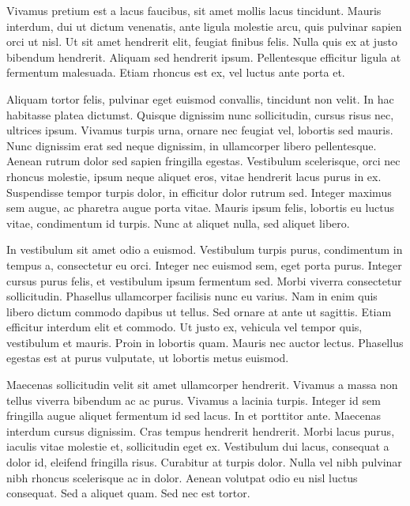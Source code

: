 
Vivamus pretium est a lacus faucibus, sit amet mollis lacus tincidunt. Mauris interdum,
dui ut dictum venenatis, ante ligula molestie arcu, quis pulvinar sapien orci ut nisl. Ut
sit amet hendrerit elit, feugiat finibus felis. Nulla quis ex at justo bibendum hendrerit.
Aliquam sed hendrerit ipsum. Pellentesque efficitur ligula at fermentum malesuada. Etiam
rhoncus est ex, vel luctus ante porta et.

Aliquam tortor felis, pulvinar eget euismod convallis, tincidunt non velit. In hac habitasse
platea dictumst. Quisque dignissim nunc sollicitudin, cursus risus nec, ultrices ipsum.
Vivamus turpis urna, ornare nec feugiat vel, lobortis sed mauris. Nunc dignissim erat sed
neque dignissim, in ullamcorper libero pellentesque. Aenean rutrum dolor sed sapien fringilla
egestas. Vestibulum scelerisque, orci nec rhoncus molestie, ipsum neque aliquet eros, vitae
hendrerit lacus purus in ex. Suspendisse tempor turpis dolor, in efficitur dolor rutrum sed.
Integer maximus sem augue, ac pharetra augue porta vitae. Mauris ipsum felis, lobortis eu
luctus vitae, condimentum id turpis. Nunc at aliquet nulla, sed aliquet libero.


In vestibulum sit amet odio a euismod. Vestibulum turpis purus, condimentum in tempus a,
consectetur eu orci. Integer nec euismod sem, eget porta purus. Integer cursus purus felis,
et vestibulum ipsum fermentum sed. Morbi viverra consectetur sollicitudin. Phasellus ullamcorper
facilisis nunc eu varius. Nam in enim quis libero dictum commodo dapibus ut tellus. Sed
ornare at ante ut sagittis. Etiam efficitur interdum elit et commodo. Ut justo ex, vehicula
vel tempor quis, vestibulum et mauris. Proin in lobortis quam. Mauris nec auctor lectus.
Phasellus egestas est at purus vulputate, ut lobortis metus euismod.

Maecenas sollicitudin velit sit amet ullamcorper hendrerit. Vivamus a massa non tellus viverra
bibendum ac ac purus. Vivamus a lacinia turpis. Integer id sem fringilla augue aliquet fermentum
id sed lacus. In et porttitor ante. Maecenas interdum cursus dignissim. Cras tempus hendrerit
hendrerit. Morbi lacus purus, iaculis vitae molestie et, sollicitudin eget ex. Vestibulum
dui lacus, consequat a dolor id, eleifend fringilla risus. Curabitur at turpis dolor. Nulla
vel nibh pulvinar nibh rhoncus scelerisque ac in dolor. Aenean volutpat odio eu nisl luctus
consequat. Sed a aliquet quam. Sed nec est tortor.

